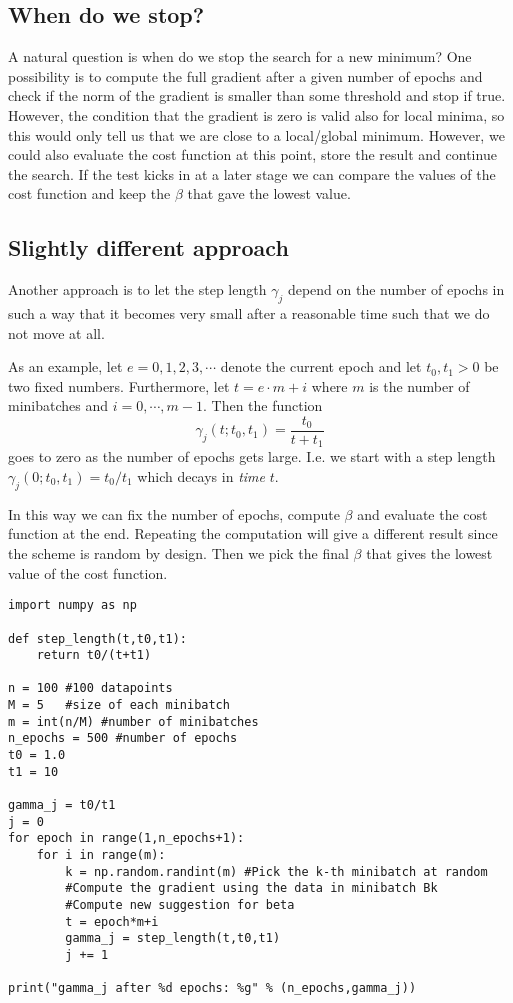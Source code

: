 \documentclass[%
oneside,                 %
final,                   %
10pt]{article}
\begin{document}
\subsection*{When do we stop?}

A natural question is when do we stop the search for a new minimum?
One possibility is to compute the full gradient after a given number
of epochs and check if the norm of the gradient is smaller than some
threshold and stop if true. However, the condition that the gradient
is zero is valid also for local minima, so this would only tell us
that we are close to a local/global minimum. However, we could also
evaluate the cost function at this point, store the result and
continue the search. If the test kicks in at a later stage we can
compare the values of the cost function and keep the $\beta$ that
gave the lowest value.

\subsection*{Slightly different approach}

Another approach is to let the step length $\gamma_j$ depend on the
number of epochs in such a way that it becomes very small after a
reasonable time such that we do not move at all.

As an example, let $e = 0,1,2,3,\cdots$ denote the current epoch and let $t_0, t_1 > 0$ be two fixed numbers. Furthermore, let $t = e \cdot m + i$ where $m$ is the number of minibatches and $i=0,\cdots,m-1$. Then the function $$\gamma_j(t; t_0, t_1) = \frac{t_0}{t+t_1} $$ goes to zero as the number of epochs gets large. I.e. we start with a step length $\gamma_j (0; t_0, t_1) = t_0/t_1$ which decays in \emph{time} $t$.

In this way we can fix the number of epochs, compute $\beta$ and
evaluate the cost function at the end. Repeating the computation will
give a different result since the scheme is random by design. Then we
pick the final $\beta$ that gives the lowest value of the cost
function.

\begin{verbatim}
import numpy as np 

def step_length(t,t0,t1):
    return t0/(t+t1)

n = 100 #100 datapoints 
M = 5   #size of each minibatch
m = int(n/M) #number of minibatches
n_epochs = 500 #number of epochs
t0 = 1.0
t1 = 10

gamma_j = t0/t1
j = 0
for epoch in range(1,n_epochs+1):
    for i in range(m):
        k = np.random.randint(m) #Pick the k-th minibatch at random
        #Compute the gradient using the data in minibatch Bk
        #Compute new suggestion for beta
        t = epoch*m+i
        gamma_j = step_length(t,t0,t1)
        j += 1

print("gamma_j after %d epochs: %g" % (n_epochs,gamma_j))
\end{verbatim}
\end{document}
